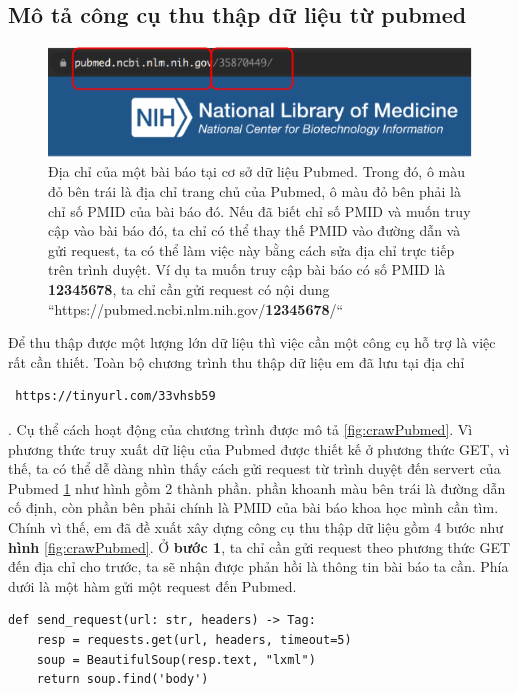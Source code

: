 \documentclass[../DoAn.tex]{subfiles}
\begin{document}
\subsection{Mô tả công cụ thu thập dữ liệu từ pubmed}
\begin{figure}
\centering
\includegraphics[width=1.\linewidth]{Hinh_ve/requestPubmed.png}
\caption{Địa chỉ của một bài báo tại cơ sở dữ liệu Pubmed. Trong đó, ô màu đỏ bên trái là địa chỉ trang chủ của Pubmed, ô màu đỏ bên phải là chỉ số PMID của bài báo đó. Nếu đã biết chỉ số PMID và muốn truy cập vào bài báo đó, ta chỉ có thể thay thế PMID vào đường dẫn và gửi request, ta có thể làm việc này bằng cách sửa địa chỉ trực tiếp trên trình duyệt. Ví dụ ta muốn truy cập bài báo có số PMID là \textbf{12345678}, ta chỉ cần gửi request có nội dung ``https://pubmed.ncbi.nlm.nih.gov/\textbf{12345678}/``}
\label{fig:reqPubmed}
\end{figure}
Để thu thập được một lượng lớn dữ liệu thì việc cần một công cụ hỗ trợ là việc rất cần thiết. Toàn bộ chương trình thu thập dữ liệu em đã lưu tại địa chỉ \begin{verbatim} https://tinyurl.com/33vhsb59 \end{verbatim}. Cụ thể cách hoạt động của chương trình được mô tả \ref{fig:crawPubmed}.
Vì phương thức truy xuất dữ liệu của Pubmed được thiết kế ở phương thức GET, vì thế, ta có thể dễ dàng nhìn thấy cách gửi request từ trình duyệt đến servert của Pubmed \ref{fig:reqPubmed} như hình gồm 2 thành phần. phần khoanh màu bên trái là đường dẫn cố định, còn phần bên phải chính là PMID của bài báo khoa học mình cần tìm. Chính vì thế, em đã đề xuất xây dựng công cụ thu thập dữ liệu gồm 4 bước như \textbf{hình} \ref{fig:crawPubmed}. Ở \textbf{bước 1}, ta  chỉ cần gửi request theo phương thức GET đến địa chỉ cho trước, ta sẽ nhận được phản hồi là thông tin bài báo ta cần. Phía dưới là một hàm gửi một request đến Pubmed.
\begin{lstlisting}
def send_request(url: str, headers) -> Tag:
    resp = requests.get(url, headers, timeout=5)
    soup = BeautifulSoup(resp.text, "lxml")
    return soup.find('body')
\end{lstlisting}
\end{document}

